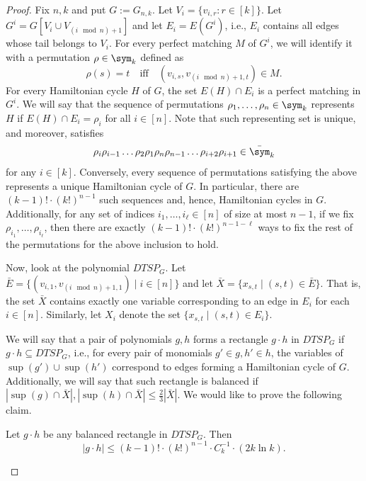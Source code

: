\begin{proof}
    Fix $n, k$ and put $G := G_{n, k}$. Let $V_i = \{ v_{i, r} : r \in [k] \}$. Let $G^i = G[V_i \cup V_{(i \mod n) + 1}]$ and let $E_i = E(G^i)$, i.e., $E_i$ contains all edges whose tail belongs to $V_i$.
    For every perfect matching $M$ of $G^i$, we will identify it with a permutation $\rho \in \sym_k$ defined as
    $$
    \rho(s) = t
    \quad \text{iff} \quad
    (v_{i, s}, v_{(i \mod n) + 1, t}) \in M.
    $$
    For every Hamiltonian cycle $H$ of $G$, the set $E(H) \cap E_i$ is a perfect matching in $G^i$. We will say that the sequence of permutations $\rho_1, \dots, \rho_n \in \sym_k$ represents $H$ if $E(H) \cap E_i = \rho_i$ for all $i \in [n]$. Note that such representing set is unique, and moreover, satisfies
    $$
    \rho_i \rho_{i - 1} \dots
    \rho_2 \rho_1
    \rho_n \rho_{n - 1} \dots
    \rho_{i + 2} \rho_{i + 1} \in \bar\sym_k
    $$
    for any $i \in [k]$.
    Conversely, every sequence of permutations satisfying the above represents a unique Hamiltonian cycle of $G$.
    In particular, there are $(k - 1)! \cdot \left(k!\right)^{n - 1}$ such sequences and, hence, Hamiltonian cycles in $G$.
    Additionally, for any set of indices $i_1, \dots, i_{\ell} \in [n]$ of size at most $n - 1$, if we fix $\rho_{i_1}, \dots, \rho_{i_{\ell}}$, then there are exactly $(k - 1)! \cdot (k!)^{n - 1 - \ell}$ ways to fix the rest of the permutations for the above inclusion to hold.
    \newline

    Now, look at the polynomial $DTSP_G$. Let $\bar{E} = \{ (v_{i, 1}, v_{(i \mod n) + 1, 1}) \mid i \in [n] \}$ and let $\bar{X} = \{ x_{s,t} \mid (s, t) \in \bar{E} \}$. That is, the set $\bar{X}$ contains exactly one variable corresponding to an edge in $E_i$ for each $i \in [n]$. Similarly, let $X_i$ denote the set $\{ x_{s,t} \mid  (s, t) \in E_i \}$.

    We will say that a pair of polynomials $g, h$ forms a rectangle $g \cdot h$ in $DTSP_G$ if $g \cdot h \subseteq DTSP_G$, i.e., for every pair of monomials $g' \in g, h' \in h$, the variables of $\sup(g') \cup \sup(h')$ correspond to edges forming a Hamiltonian cycle of $G$.
    Additionally, we will say that such rectangle is balanced if $|\sup(g) \cap \bar{X}|, |\sup(h) \cap \bar{X}| \leq \frac{2}{3} |\bar{X}|$. We would like to prove the following claim.
    \begin{claim}\label{lem:dtsp_rect_bound}
        Let $g \cdot h$ be any balanced rectangle in $DTSP_G$. Then
        $$
        |g \cdot h| \leq (k - 1)! \cdot (k!)^{n - 1} \cdot C_k^{-1} \cdot (2k \ln k).
        $$
    \end{claim}


\end{proof}
